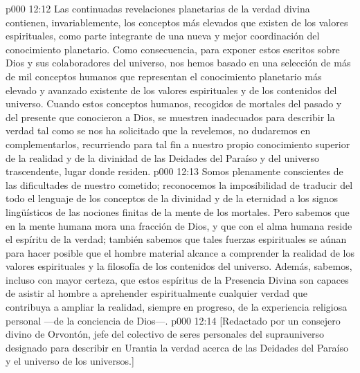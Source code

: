 \vs p000 12:12 Las continuadas revelaciones planetarias de la verdad divina contienen, invariablemente, los conceptos más elevados que existen de los valores espirituales, como parte integrante de una nueva y mejor coordinación del conocimiento planetario. Como consecuencia, para exponer estos escritos sobre Dios y sus colaboradores del universo, nos hemos basado en una selección de más de mil conceptos humanos que representan el conocimiento planetario más elevado y avanzado existente de los valores espirituales y de los contenidos del universo. Cuando estos conceptos humanos, recogidos de mortales del pasado y del presente que conocieron a Dios, se muestren inadecuados para describir la verdad tal como se nos ha solicitado que la revelemos, no dudaremos en complementarlos, recurriendo para tal fin a nuestro propio conocimiento superior de la realidad y de la divinidad de las Deidades del Paraíso y del universo trascendente, lugar donde residen.
\vs p000 12:13 Somos plenamente conscientes de las dificultades de nuestro cometido; reconocemos la imposibilidad de traducir del todo el lenguaje de los conceptos de la divinidad y de la eternidad a los signos lingüísticos de las nociones finitas de la mente de los mortales. Pero sabemos que en la mente humana mora una fracción de Dios, y que con el alma humana reside el espíritu de la verdad; también sabemos que tales fuerzas espirituales se aúnan para hacer posible que el hombre material alcance a comprender la realidad de los valores espirituales y la filosofía de los contenidos del universo. Además, sabemos, incluso con mayor certeza, que estos espíritus de la Presencia Divina son capaces de asistir al hombre a aprehender espiritualmente cualquier verdad que contribuya a ampliar la realidad, siempre en progreso, de la experiencia religiosa personal ---de la conciencia de Dios---.
\vsetoff
\vs p000 12:14 [Redactado por un consejero divino de Orvontón, jefe del colectivo de seres personales del suprauniverso designado para describir en Urantia la verdad acerca de las Deidades del Paraíso y el universo de los universos.]

